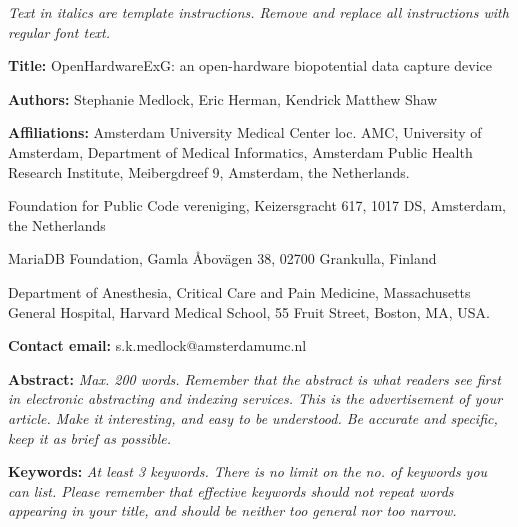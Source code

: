 \documentclass[11pt, letterpaper]{article}
\begin{document}
\begin{flushleft}

\textit{Text in italics are template instructions. Remove and replace all
	instructions with regular font text.}

\setlength{\parindent}{0pt}
\setlength{\parskip}{10pt}

\textbf{Title:} OpenHardwareExG: an open-hardware biopotential data capture device

\textbf{Authors:} Stephanie Medlock, Eric Herman, Kendrick Matthew Shaw

\textbf{Affiliations:} Amsterdam University Medical Center loc. AMC, University of Amsterdam, Department of Medical Informatics, Amsterdam Public Health Research Institute, Meibergdreef 9, Amsterdam, the Netherlands.

Foundation for Public Code vereniging, Keizersgracht 617, 1017 DS, Amsterdam, the Netherlands

MariaDB Foundation, Gamla \r{A}bov\"{a}gen 38, 02700 Grankulla, Finland

Department of Anesthesia, Critical Care and Pain Medicine, Massachusetts General Hospital, Harvard Medical School, 55 Fruit Street, Boston, MA, USA.


\textbf{Contact email:} s.k.medlock@amsterdamumc.nl

\textbf{Abstract:} \textit{Max. 200 words. Remember that the abstract is what readers see first in electronic abstracting and indexing services. This is the advertisement of your article. Make it interesting, and easy to be understood. Be accurate and specific, keep it as brief as possible.}

\textbf{Keywords:} \textit{At least 3 keywords. There is no limit on the no. of keywords you can list. Please remember that effective keywords should not repeat words appearing in your title, and should be neither too general nor too narrow.}


\end{flushleft}
\end{document}
